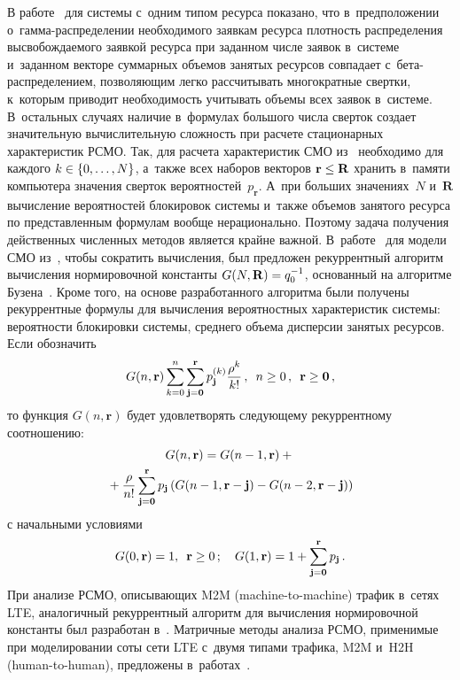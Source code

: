 \begin{multicols}{2}
В работе~\cite{Naumov_1_2014} для системы с~одним типом ресурса показано, что 
в~предположении о~гам\-ма-рас\-пре\-де\-ле\-нии необходимого заявкам ресурса плотность 
распределения высвобождаемого заявкой ресурса при заданном числе заявок 
в~системе и~заданном векторе суммарных объемов занятых ресурсов совпадает 
с~бе\-та-рас\-пре\-де\-ле\-ни\-ем, позволяющим легко рассчитывать многократные свертки, к~которым 
приводит необходимость учитывать объемы всех заявок в~системе. В~остальных 
случаях наличие в~формулах большого числа сверток создает значительную 
вычислительную сложность при расчете стационарных характеристик РСМО.
Так, для расчета характеристик СМО из~\cite{Sopin_7_2016} необходимо для каж\-до\-го 
$k\hm\in \{0,\ldots,N\}$, а~также всех наборов векторов $\mathbf{r}\hm \leq \mathbf{R}$ 
хранить в~памяти компьютера значения сверток вероятностей~$p_{\mathbf{r}}$. 
А~при больших значениях~$N$ и~$\mathbf{R}$ вычисление вероятностей блокировок 
системы и~также объемов занятого ресурса по представленным формулам вообще 
нерационально. Поэтому задача получения действенных численных методов является 
крайне важной.
В~работе~\cite{Sopin_8_2017} для модели СМО из~\cite{Sopin_7_2016}, чтобы 
сократить вычисления, был предложен рекуррентный алгоритм вычисления 
нормировочной константы $G(N,\mathbf{R})\hm=q_0^{-1}$, основанный на алгоритме 
Бузена~\cite{Buzen}. Кроме того, на основе разработанного алгоритма были 
получены рекуррентные формулы для вычисления вероятностных характеристик 
сис\-те\-мы: вероятности блокировки сис\-те\-мы, среднего объема дисперсии занятых 
ресурсов.
Если обозначить
\begin{equation*}
G(n,\mathbf{r})\sum\limits_{k=0}^{n}\sum\limits_{\mathbf{j}=\mathbf{0}}^{\mathbf{r}}p_{\mathbf
{j}}^{(k)}\displaystyle\frac{\displaystyle \rho^k\mathstrut}{\displaystyle k!\mathstrut}\,, \enskip 
n\geq 0\,, \enskip \mathbf{r}\geq \mathbf{0}\,,
\end{equation*}
то функция $G(n,\mathbf{r})$ будет удовлетворять следующему рекуррентному 
соотношению:
\begin{multline*}
G(n,\mathbf{r})=G(n-1,\mathbf{r})+{}\\
{}+\displaystyle\frac{\displaystyle \rho\mathstrut}{\displaystyle n!\mathstrut}
\sum\limits_{\mathbf{j}=\mathbf{0}}^{\mathbf{r}}p_{\mathbf{j}}
\left( G(n-1,\mathbf{r}-\mathbf{j})- G(n-2,\mathbf{r}-\mathbf{j})   \right)
\end{multline*}
с начальными условиями
\begin{equation*}
G(0,\mathbf{r})=1,\enskip \mathbf{r}\geq 0\,; \quad
G(1,\mathbf{r})=1+\sum\limits_{\mathbf{j}=\mathbf{0}}^{\mathbf{r}}p_{\mathbf{j}}\,.
\end{equation*}
При анализе РСМО,  описывающих M2M (machine-to-machine) трафик в~сетях LTE, 
аналогичный рекуррент\-ный алгоритм для вычисления нормировочной константы был 
разработан в~\cite{Sopin_11_2017}. Мат\-рич\-ные методы анализа РСМО, применимые при 
моделировании соты сети LTE с~двумя типами трафика, M2M и~H2H (human-to-human), 
предложены в~работах~\cite{Vish_2017,Vish_2016}.


\end{multicols}
